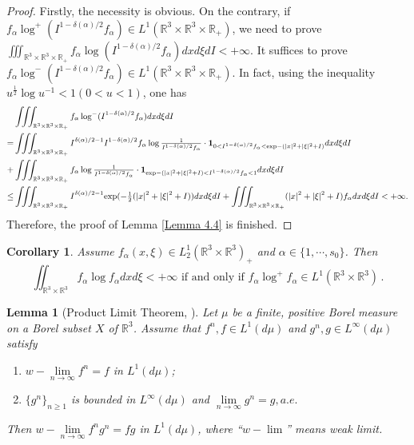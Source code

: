 \documentclass[reqno,11pt]{amsart}
\newtheorem{corollary}{Corollary}[section]
\newtheorem{lemma}{Lemma}[section]
\numberwithin{equation}{section}
\def\R{\mathbb{R}}
\def\exp{\mathrm{exp}}
\begin{document}
\begin{proof}
	Firstly, the necessity is obvious. On the contrary, if $f_\alpha \log ^+ (I^{1-\delta(\alpha)/2}f_\alpha) \in L^1(\R^3 \times \R^3 \times \R_+) $, we need to prove $\iiint_{\R^3 \times \R^3\times \R_+ } f_\alpha \log (I^{1-\delta(\alpha)/2}f_\alpha) dxd\xi dI <+\infty $. It suffices to prove $f_\alpha \log ^- (I^{1-\delta(\alpha)/2}f_\alpha) \in L^1(\R^3 \times \R^3\times \R_+ )$. In fact, using the inequality $u^{\frac{1}{2}} \log u^{-1} <1 (0<u<1)$, one has
	\begin{equation*}{\small
		\begin{aligned}
		&\iiint_{\R^3 \times \R^3\times \R_+ } f_\alpha \log^- (I^{1-\delta(\alpha)/2}f_\alpha) dxd\xi dI\\
			=& \iiint_{\R^3 \times \R^3\times \R_+} I^{\delta(\alpha)/2-1} I^{1-\delta(\alpha)/2} f_\alpha \log \tfrac{1}{I^{1-\delta(\alpha)/2}f_\alpha} \cdot \mathbf{1}_{0<I^{1-\delta(\alpha)/2}f_\alpha< \exp-(|x|^2 + |\xi|^2 +I)} dxd\xi dI\\
		+& \iiint_{\R^3 \times \R^3\times \R_+  }   f_\alpha \log \tfrac{1}{I^{1-\delta(\alpha)/2}f_\alpha} \cdot \mathbf{1}_{\exp-(|x|^2 + |\xi|^2 +I ) <I^{1-\delta(\alpha)/2}f_\alpha <1} dxd\xi dI\\
		\leq & \iiint_{\R^3 \times \R^3 \times \R_+} I^{\delta(\alpha)/2-1}  \exp(-\tfrac{1}{2}(|x|^2 + |\xi|^2+I )) dxd\xi dI+ \iiint_{\R^3 \times \R^3\times \R_+} (|x|^2 + |\xi|^2+I ) f_\alpha dx d\xi dI < +\infty. 
		\end{aligned}}
	\end{equation*}
	Therefore, the proof of Lemma \ref{Lemma 4.4} is finished.
\end{proof}

\begin{corollary}\label{cor4.5}
		Assume $f_\alpha(x,\xi) \in L^1_2 (\R^3 \times \R^3 )_+ $ and $\alpha \in \{1,\cdots,s_0\}$. Then
	\begin{equation*}
		\iint_{\R^3 \times \R^3 } f_\alpha \log f_\alpha dxd\xi <+\infty \textrm{ if and only if } f_\alpha \log ^+ f_\alpha \in L^1(\R^3 \times \R^3 ) \,.
	\end{equation*} 
\end{corollary}

\begin{lemma}[Product Limit Theorem, \cite{BGL-1993-CPAM,Diperna-Lions}]\label{product limit} 
Let $\mu$ be a finite, positive Borel measure on a Borel subset $X$ of $\R^3$. Assume that $f^n,f\in L^1(d \mu)$ and $g^n,g\in L^\infty(d \mu)$ satisfy
\begin{enumerate}
\item {$w-\lim \limits_{n\rightarrow \infty} f^n = f$ in $L^1(d \mu)$;}
\item {$\{g^n\}_{n\geq 1}$ is bounded in $L^\infty (d \mu)$ and $\lim \limits_{n\rightarrow \infty} g^n=g, a.e.$}
\end{enumerate}
Then $w-\lim \limits_{n \rightarrow \infty} f^n g^n= fg$ in $L^1(d \mu)$, where “$w-\lim$” means weak limit.
\end{lemma}
\end{document}
